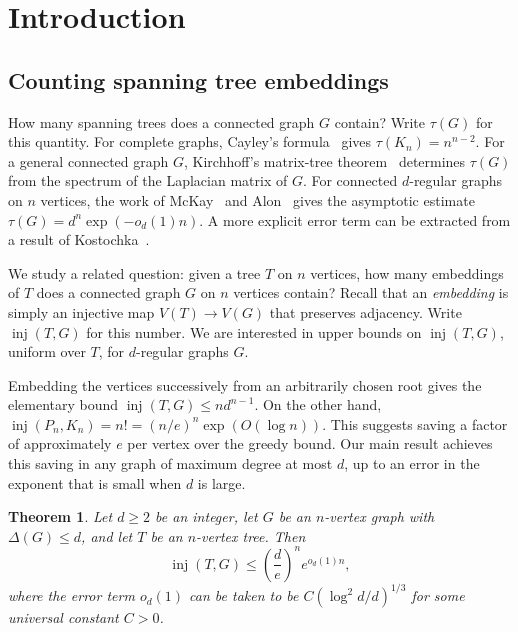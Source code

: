 \documentclass[10pt,a4paper]{amsart}
\numberwithin{equation}{section}
\newtheorem{theorem}{Theorem}[section]
\theoremstyle{definition}
\theoremstyle{remark}
\DeclareMathOperator{\inj}{inj}
\begin{document}
\section{Introduction}

\subsection{Counting spanning tree embeddings}
How many spanning trees does a connected graph $G$ contain? Write $\tau(G)$ for this quantity.
For complete graphs, Cayley's formula~\cite{Cayley} gives $\tau(K_n)=n^{n-2}$. 
For a general connected graph $G$, Kirchhoff's matrix-tree theorem~\cite{kirchhoff1847ueber} determines $\tau(G)$ from the spectrum of the Laplacian matrix of $G$.
For connected $d$-regular graphs on $n$ vertices, the work of McKay~\cite{McKay} and Alon~\cite{Alon} gives the asymptotic estimate $\tau(G)=d^n\exp(-o_d(1)n)$. A more explicit error term can be extracted from a result of Kostochka~\cite{kostochka1995number}.

We study a related question: given a tree $T$ on $n$ vertices, how many embeddings of $T$ does a connected graph $G$ on $n$ vertices contain? Recall that an \emph{embedding} is simply an injective map $V(T)\rightarrow V(G)$ that preserves adjacency. Write $\inj(T,G)$ for this number. 
We are interested in upper bounds on $\inj(T,G)$, uniform over $T$, for $d$-regular graphs $G$.

Embedding the vertices successively from an arbitrarily chosen root gives the elementary bound $\inj(T,G)\leq nd^{n-1}$. On the other hand, $\inj(P_n,K_n)=n!=(n/e)^n\exp(O(\log n))$. This suggests saving a factor of approximately $e$ per vertex over the greedy bound. Our main result achieves this saving in any graph of maximum degree at most $d$, up to an error in the exponent that is small when $d$ is large.


\begin{theorem}\label{thm:main}
Let $d\geq 2$ be an integer, let $G$ be an $n$-vertex graph with $\Delta(G)\le d$, and let $T$ be an $n$-vertex tree. Then
\[
    \inj(T,G)\leq\left(\frac de\right)^n
    e^{o_d(1)n},
\]
where the error term $o_d(1)$ can be taken to be $C(\log^2d/d)^{1/3}$ for some universal constant $C>0$.
\end{theorem}
\end{document}
